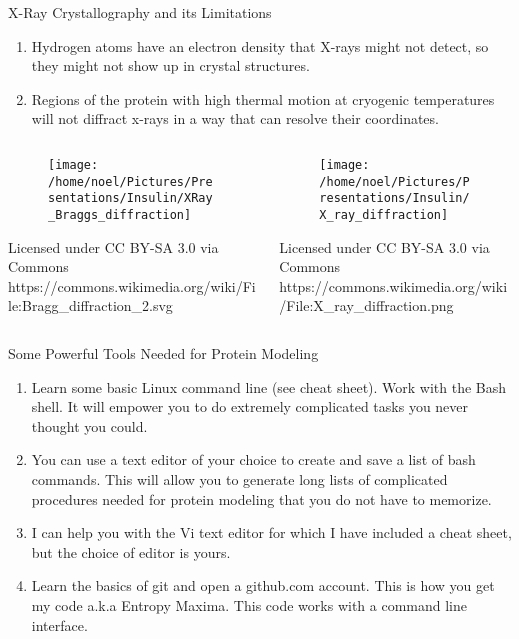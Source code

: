 \documentclass{beamer}
\begin{document}
\begin{frame}[shrink=30]{X-Ray Crystallography and its Limitations}
       \begin{enumerate}
             \item Hydrogen atoms have an electron density that X-rays might not detect, so they might not show up in crystal structures.
             \item Regions of the protein with high thermal motion at cryogenic temperatures will not diffract x-rays in a way that can resolve their coordinates.
       \end{enumerate}
  \begin{columns}
      \begin{column}{0.5\textwidth}
        \begin{figure}
           \texttt{[image: /home/noel/Pictures/Presentations/Insulin/XRay\_Braggs\_diffraction]}
        \end{figure}
        {\tiny Licensed under CC BY-SA 3.0 via Commons \\ https://commons.wikimedia.org/wiki/File:Bragg\_diffraction\_2.svg}
      \end{column}
      \begin{column}{0.5\textwidth}
        \begin{figure}
           \texttt{[image: /home/noel/Pictures/Presentations/Insulin/X\_ray\_diffraction]}
        \end{figure}
        {\tiny Licensed under CC BY-SA 3.0 via Commons \\ https://commons.wikimedia.org/wiki/File:X\_ray\_diffraction.png}
      \end{column}
   \end{columns}
\end{frame}
\begin{frame}[shrink=10]{Some Powerful Tools Needed for Protein Modeling }
       \begin{enumerate}
             \item Learn some basic Linux command line (see cheat sheet). Work with the Bash shell. It will empower you to do extremely 
                   complicated tasks you never thought you could.
             \item You can use a text editor of your choice to create and save a list of bash commands. This will allow you to generate
                   long lists of complicated procedures needed for protein modeling that you do not have to memorize.
             \item I can help you with the Vi text editor for which I have included a cheat sheet, but the choice of editor is yours.
             \item Learn the basics of git and open a github.com account. This is how you get my code a.k.a Entropy Maxima. This code
                   works with a command line interface.
       \end{enumerate}
\end{frame}
\end{document}

